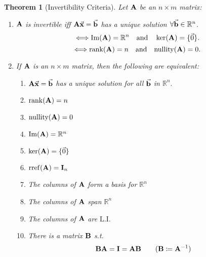 \documentclass[12pt, a4paper]{article}
\newtheorem{thm}{Theorem}[subsection]
\def\R{{\mathbb{R}}}
\def\IM{{\mathrm{Im}}}
\def\rref{\mathrm{rref}}
\def\rank{\mathrm{rank}}
\def\nullity{\mathrm{nullity}}
\def\vecx{\va{x}}
\def\vecb{\va{b}}
\def\matrixA{\vb{A}}
\def\matrixB{\vb{B}}
\def\matrixI{\vb{I}}
\def\LI{\mathrm{L.I.}}
\begin{document}
\begin{thm}[Invertibility Criteria]
	Let $\matrixA$ be an $n\times m$ matrix: 
	\begin{enumerate}
		\item $\matrixA$ is invertible \emph{iff} $\matrixA\vecx=\vecb$ has a unique solution $\forall\vecb\in\R^n$.
		\[\Longleftrightarrow\IM(\matrixA)=\R^n\quad\text{and}\quad\ker(\matrixA)=\{\vec{0}\}.\]
		\[\Longleftrightarrow\rank(\matrixA)=n\quad\text{and}\quad\nullity(\matrixA)=0.\]
		\item If $\matrixA$ is an $n\times m$ matrix, then the following are equivalent: 
		\begin{enumerate}
			\item $\matrixA\vecx=\vecb$ has a unique solution for all $\vecb$ in $\R^n.$
			\item $\rank(\matrixA)=n$
			\item $\nullity(\matrixA)=0$
			\item $\IM(\matrixA)=\R^n$
			\item $\ker(\matrixA)=\{\vec{0}\}$
			\item $\rref(\matrixA)=\matrixI_n$
			\item The columns of $\matrixA$ form a basis for $\R^n$
			\item The columns of $\matrixA$ span $\R^n$
			\item The columns of $\matrixA$ are $\LI$
			\item There is a matrix $\matrixB$ \emph{s.t.} \[\matrixB\matrixA=\matrixI=\matrixA\matrixB\qquad(\matrixB\coloneqq\matrixA^{-1})\] 
		\end{enumerate}
	\end{enumerate}
\end{thm}
\end{document}
